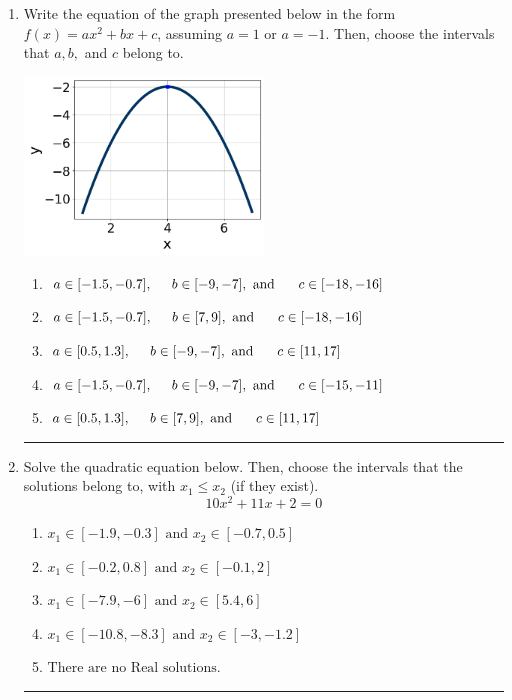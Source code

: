 \documentclass[14pt]{extbook}
\newcommand{\litem}[1]{\item#1\hspace*{-1cm}\rule{\textwidth}{0.4pt}}
\begin{document}
\begin{enumerate}
{\begin{enumerate}[label=\Alph*.]
\end{enumerate} }
\litem{
Write the equation of the graph presented below in the form $f(x)=ax^2+bx+c$, assuming  $a=1$ or $a=-1$. Then, choose the intervals that $a, b,$ and $c$ belong to.
\begin{center}
    \includegraphics[width=0.5\textwidth]{../Figures/quadraticGraphToEquationC.png}
\end{center}
\begin{enumerate}[label=\Alph*.]
\item \( a \in [-1.5, -0.7], \hspace*{5mm} b \in [-9, -7], \text{ and } \hspace*{5mm} c \in [-18, -16] \)
\item \( a \in [-1.5, -0.7], \hspace*{5mm} b \in [7, 9], \text{ and } \hspace*{5mm} c \in [-18, -16] \)
\item \( a \in [0.5, 1.3], \hspace*{5mm} b \in [-9, -7], \text{ and } \hspace*{5mm} c \in [11, 17] \)
\item \( a \in [-1.5, -0.7], \hspace*{5mm} b \in [-9, -7], \text{ and } \hspace*{5mm} c \in [-15, -11] \)
\item \( a \in [0.5, 1.3], \hspace*{5mm} b \in [7, 9], \text{ and } \hspace*{5mm} c \in [11, 17] \)

\end{enumerate} }
\litem{
Solve the quadratic equation below. Then, choose the intervals that the solutions belong to, with $x_1 \leq x_2$ (if they exist).\[ 10x^{2} +11 x + 2 = 0 \]\begin{enumerate}[label=\Alph*.]
\item \( x_1 \in [-1.9, -0.3] \text{ and } x_2 \in [-0.7, 0.5] \)
\item \( x_1 \in [-0.2, 0.8] \text{ and } x_2 \in [-0.1, 2] \)
\item \( x_1 \in [-7.9, -6] \text{ and } x_2 \in [5.4, 6] \)
\item \( x_1 \in [-10.8, -8.3] \text{ and } x_2 \in [-3, -1.2] \)
\item \( \text{There are no Real solutions.} \)


\end{enumerate}}
\end{enumerate}
\end{document}
